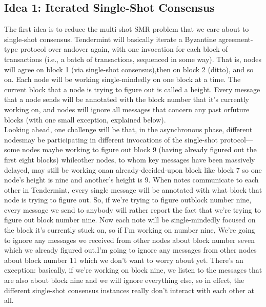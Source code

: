 \subsection{Idea 1: Iterated Single-Shot Consensus}
The first idea is to reduce the multi-shot SMR problem that we care about to single-shot consensus. Tendermint will basically iterate a 
Byzantine agreement-type protocol over andover again, with one invocation for each block of transactions (i.e., a batch of transactions,
sequenced in some way). That is, nodes will agree on block 1 (via single-shot consensus),then on block 2 (ditto), and so on. Each node 
will be working single-mindedly on one block at a time. The current block that a node is trying to figure out is called a height. Every 
message that a node sends will be annotated with the block number that it's currently working on, and nodes will ignore all messages that 
concern any past orfuture blocks (with one small exception, explained below).\\Looking ahead, one challenge will be that, in the 
asynchronous phase, different nodesmay be participating in different invocations of the single-shot protocol—some nodes maybe working to 
figure out block 9 (having already figured out the first eight blocks) whileother nodes, to whom key messages have been massively delayed, 
may still be working onan already-decided-upon block like block 7 so one node's height is nine and another's height is 9. When notes 
communicate to each other in Tendermint, every single message will be annotated with what block that node is trying to figure out. So, if 
we're trying to figure outblock number nine, every message we send to anybody will rather report the fact that we're trying to figure out 
block number nine. Now each note will be single-mindedly focused on the block it's currently stuck on, so if I'm working on number nine, 
We're going to ignore any messages we received from other nodes about block number seven which we already figured out.I'm going to ignore 
any messages from other nodes about block number 11 which we don't want to worry about yet. There's an exception: basically, if we're 
working on block nine, we listen to the messages that are also about block nine and we will ignore everything else, so in effect, the 
different single-shot consensus instances really don't interact with each other at all.



